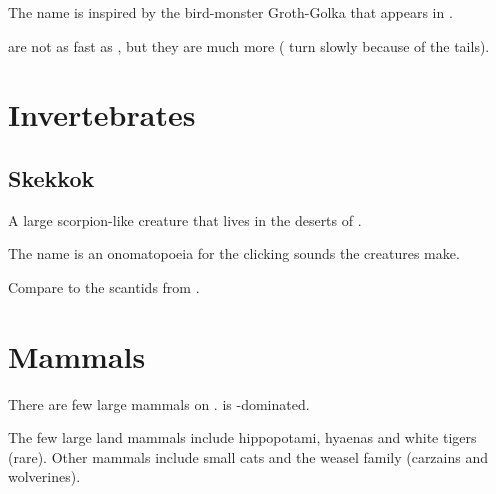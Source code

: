 The name is inspired by the bird-monster Groth-Golka that appears in . 

\Grulcans{} are not as fast as , but they are much more \manoeuvrable (\relcs{} turn slowly because of the tails). 















\section{Invertebrates}









\subsection{Skekkok}
A large scorpion-like creature that lives in the deserts of \Durcac. 

The name is an onomatopoeia for the clicking sounds the creatures make.

Compare to the scantids from \cite{VideoGame:Starcraft}. 















\section{Mammals}
There are few large mammals on \Miith. 
\Miith{} is \saurian-dominated. 

The few large land mammals include hippopotami, hyaenas and white tigers (rare). 
Other mammals include small cats and the weasel family (carzains and wolverines). 










